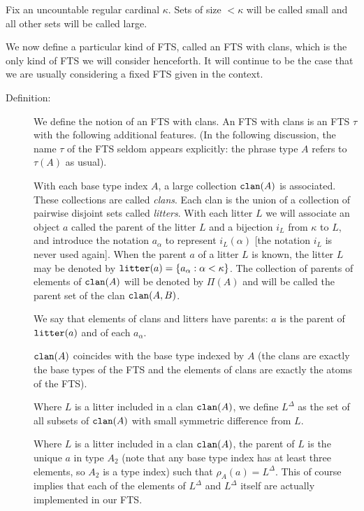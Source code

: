 \documentclass{article}
\begin{document}
Fix an uncountable regular cardinal $\kappa$.  Sets of size $<\kappa$ will be called small and all other sets will be called large.

We now define a particular kind of FTS, called an FTS with clans, which is the only kind of FTS we will consider henceforth.   It will continue to be the case that we are usually considering a fixed FTS given in the context.

\begin{description}

\item[Definition:]   We define the notion of an FTS with clans.  An FTS with clans is an FTS $\tau$ with the following additional features.  (In the following discussion, the name $\tau$ of the FTS seldom appears explicitly:  the phrase type $A$ refers to $\tau(A)$ as usual).

With each base type index $A$, a large collection ${\tt clan}(A)$ is associated.  These collections are called {\em clans\/}.   Each clan is the union of a collection of pairwise disjoint sets called {\em litters\/}.
With each litter $L$ we will associate an object $a$ called the parent of the litter $L$ and a bijection $i_L$ from $\kappa$ to $L$, and introduce the notation
$a_{\alpha}$ to represent $i_L(\alpha)$  [the notation $i_L$ is never used again].  When the parent $a$ of a litter $L$ is known, the litter $L$ may be denoted by ${\tt litter}(a) = \{a_{\alpha}:\alpha<\kappa\}$.  The collection of parents of elements of ${\tt clan}(A)$ will be denoted by $\Pi(A)$ and will be called the parent set of the clan ${\tt clan}(A,B)$.

We say that elements of clans and litters have parents:  $a$ is the parent of ${\tt litter}(a)$ and of each $a_{\alpha}$.


${\tt clan}(A)$ coincides with the base type indexed by $A$ (the clans are exactly the base types of the FTS and the elements of clans are exactly the atoms of the FTS).

Where $L$ is a litter included in a clan ${\tt clan}(A)$, we define $L^{\Delta}$ as the set of all subsets of ${\tt clan}(A)$ with small symmetric difference from $L$.

Where $L$ is a litter included in a clan ${\tt clan}(A)$, the parent of $L$ is the unique $a$ in type $A_2$ (note that any base type index has at least three elements, so $A_2$ is a type index) such that $\rho_{A}(a)=L^{\Delta}$.  This of course implies that each of the elements of $L^{\Delta}$ and $L^{\Delta}$ itself are actually implemented in our FTS.


\end{description}
\end{document}
